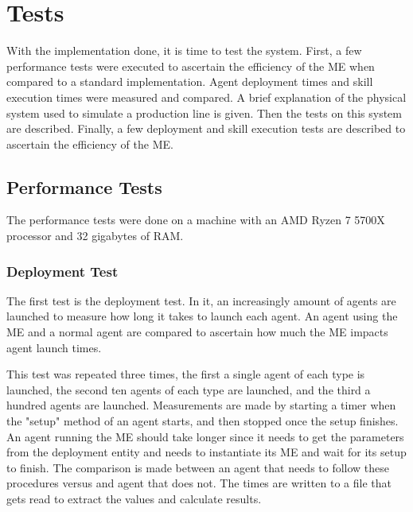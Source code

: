 


\chapter{Tests}
\label{cha:tests}

With the implementation done, it is time to test the system. First, a few performance tests were executed to ascertain the efficiency of the \acrlong{ME} when compared to a standard implementation. Agent deployment times and skill execution times were measured and compared. A brief explanation of the physical system used to simulate a production line is given. Then the tests on this system are described. Finally, a few deployment and skill execution tests are described to ascertain the efficiency of the \acrshort{ME}.

\section{Performance Tests}
\label{sec:performance_tests}

The performance tests were done on a machine with an AMD Ryzen 7 5700X processor and 32 gigabytes of RAM.

\subsection{Deployment Test}

The first test is the deployment test. In it, an increasingly amount of agents are launched to measure how long it takes to launch each agent. An agent using the \acrlong{ME} and a normal agent are compared to ascertain how much the \acrshort{ME} impacts agent launch times.

This test was repeated three times, the first a single agent of each type is launched, the second ten agents of each type are launched, and the third a hundred agents are launched. Measurements are made by starting a timer when the "setup" method of an agent starts, and then stopped once the setup finishes. An agent running the \acrlong{ME} should take longer since it needs to get the parameters from the deployment entity and needs to instantiate its \acrshort{ME} and wait for its setup to finish. The comparison is made between an agent that needs to follow these procedures versus and agent that does not. The times are written to a file that gets read to extract the values and calculate results.

